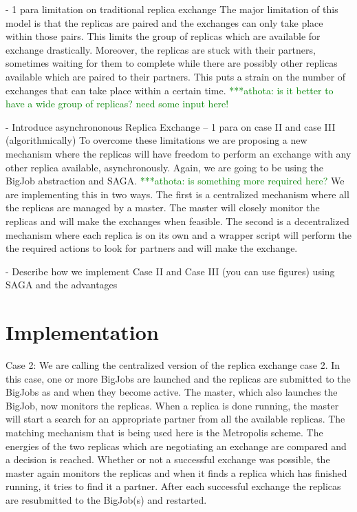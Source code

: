 \documentclass[a4paper,10pt]{article}
\newcommand{\athotanote}[1]{ {\textcolor{green} { ***athota: #1 }}}
\begin{document}
- 1 para limitation on traditional replica exchange
The major limitation of this model is that the replicas are paired and the exchanges can only take place within those pairs. 
This limits the group of replicas which are available for exchange drastically. Moreover, the replicas are stuck with their partners, 
sometimes waiting for them to complete while there are possibly other replicas available which are paired to their partners.
This puts a strain on the number of exchanges that can take place within a certain time.
\athotanote{is it better to have a wide group of replicas?  need some input here!}

- Introduce asynchrononous Replica Exchange --  1 para on case II and case
III (algorithmically)
To overcome these limitations we are proposing a new mechanism where the replicas will have freedom to perform an exchange
with any other replica available, asynchronously. Again, we are going to be using the BigJob abstraction
and SAGA. \athotanote{is something more required here?}
We are implementing this in two ways.
The first is a centralized mechanism where all the replicas are managed by a master. The master will closely
monitor the replicas and will make the exchanges when feasible. 
The second is a decentralized mechanism where each replica is on its own and a wrapper script will perform the
the required actions to look for partners and will make the exchange.

- Describe how we implement Case II and Case III (you can use figures)
  using SAGA and the advantages
\section{Implementation}
Case 2: 
We are calling the centralized version of the replica exchange case 2. In this case, one or more BigJobs are
launched and the replicas are submitted to the BigJobs as and when they become active. The master, which also launches the BigJob,
now monitors the replicas. When a replica is done running, the master will start a search for an appropriate partner from all the available replicas. The matching mechanism
that is being used here is the Metropolis scheme. The energies of the two replicas which are negotiating an exchange are compared and a decision is reached.
Whether or not a successful exchange was possible, the master again monitors the replicas and when it finds a replica which has finished running, it tries to find it a partner.
After each successful exchange the replicas are resubmitted to the BigJob(s) and restarted.
\end{document}
